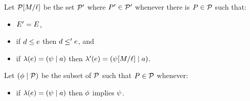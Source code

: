 Let $\mathcal{P}[M/\ell]$ be the set $\mathcal{P}'$ where $P'\in\mathcal{P}'$ whenever
there is $P\in\mathcal{P}$ such that:
\begin{itemize}
\item $E' = E$,
\item if $d \le e$ then $d \le' e$, and
\item if $\lambda(e) = (\psi \mid a)$ then $\lambda'(e) = (\psi[M/\ell] \mid a)$.
\end{itemize}
Let $(\phi \mid \mathcal{P})$ be the subset of $\mathcal{P}$ such that $P\in\mathcal{P}$ whenever:
\begin{itemize}
\item if $\lambda(e) = (\psi \mid a)$ then $\phi$ implies $\psi$.
\end{itemize}
